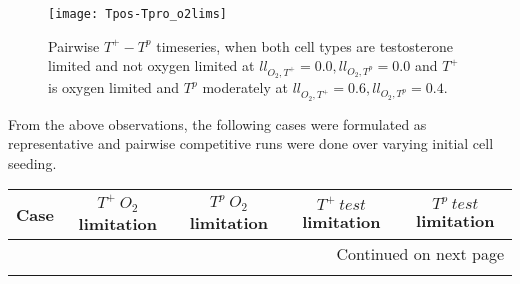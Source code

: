 \begin{figure}[h!]
  \centering
  \texttt{[image: Tpos-Tpro\_o2lims]}
  \caption[Pairwise $T^+ - T^p$ timeseries, oxygen limitation]{Pairwise $T^+ - T^p$ timeseries, when both cell types are testosterone limited and not oxygen limited at $ll_{O_2,T^+}=0.0, ll_{O_2,T^p}=0.0$ and $T^+$ is oxygen limited and $T^p$ moderately at $ll_{O_2,T^+}=0.6, ll_{O_2,T^p}=0.4$.}
  \label{fig_Tpos-Tpro_o2lims}
\end{figure}

\newpage

From the above observations, the following cases were formulated as representative and pairwise competitive runs were done over varying initial cell seeding.

\begin{longtable}[c]{|l|l|l|l|l|}

  \hline \multicolumn{1}{|c|}{\textbf{Case}} & \multicolumn{1}{c|}{\textbf{$T^+\ O_2$ limitation}} & \multicolumn{1}{c|}{\textbf{$T^p\ O_2$ limitation}} & \multicolumn{1}{c|}{\textbf{$T^+\ test$ limitation}} & \multicolumn{1}{c|}{\textbf{$T^p\ test$ limitation}}  \\ \hline
  \endhead

  \hline \multicolumn{5}{|r|}{{Continued on next page}} \\ \hline
  \endfoot


\end{longtable}
